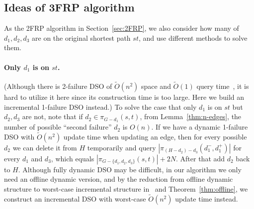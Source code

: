 \documentclass[11pt]{article}
\theoremstyle{plain}
\theoremstyle{definition}
\newcommand{\set}[1]{\{ #1 \}}
\newcommand{\og}[3]{\pi_{G-#3}\left(#1,#2\right)}
\begin{document}
\subsection{Ideas of 3FRP algorithm}



As the 2FRP algorithm in Section~\ref{sec:2FRP}, we also consider how many of $d_1,d_2,d_3$ are on the original shortest path $st$, and use different methods to solve them.



\paragraph{Only $d_1$ is on $st$.} (Although there is 2-failure DSO of $\tilde{O}(n^2)$ space and $\tilde{O}(1)$ query time~\cite{duan2009dual}, it is hard to utilize it here since its construction time is too large. Here we build an incremental 1-failure DSO instead.) To solve the case that only $d_1$ is on $st$ but $d_2,d_3$ are not, note that if $d_2\in \pi_{G-d_1}(s,t)$, from Lemma~\ref{thm:n-edges}, the number of possible ``second failure'' $d_2$ is $O(n)$. If we have a dynamic 1-failure DSO with $\tilde{O}(n^2)$ update time when updating an edge, then for every possible $d_2$ we can delete it from $H$ temporarily and query $|\pi_{(H-d_2)-d_3}(d_1^-, d_1^+)|$ for every $d_1$ and $d_3$, which equals $|\og{s}{t}{\set{d_1, d_2,d_3}}|+2N$. After that add $d_2$ back to $H$. Although fully dynamic DSO may be difficult, in our algorithm we only need an offline dynamic version, and by the reduction from offline dynamic structure to worst-case incremental structure in~\cite{peng2023fully} and Theorem~\ref{thm:offline}, we construct an incremental DSO with worst-case $\tilde{O}(n^2)$ update time instead.
\end{document}
